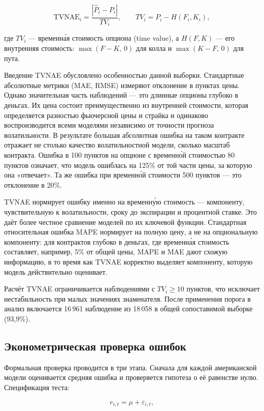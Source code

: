 \documentclass[11pt,a4paper]{article}
\begin{document}
\begin{equation}
\text{TVNAE}_i = \frac{|\hat{P}_i - P_i|}{TV_i},
\qquad
TV_i = P_i - H(F_i, K_i),
\end{equation}

где $TV_i$ --- временна́я стоимость опциона (time value), а $H(F, K)$ --- его внутренняя стоимость: $\max(F - K,\, 0)$ для колла и $\max(K - F,\, 0)$ для пута.

Введение TVNAE обусловлено особенностью данной выборки. Стандартные абсолютные метрики (MAE, RMSE) измеряют отклонение в пунктах цены. Однако значительная часть наблюдений --- это длинные опционы глубоко в деньгах. Их цена состоит преимущественно из внутренней стоимости, которая определяется разностью фьючерсной цены и страйка и одинаково воспроизводится всеми моделями независимо от точности прогноза волатильности. В результате большая абсолютная ошибка на таком контракте отражает не столько качество волатильностной модели, сколько масштаб контракта. Ошибка в 100 пунктов на опционе с временно́й стоимостью 80 пунктов означает, что модель ошиблась на 125\% от той части цены, за которую она «отвечает». Та же ошибка при временно́й стоимости 500 пунктов --- это отклонение в 20\%.

TVNAE нормирует ошибку именно на временну́ю стоимость --- компоненту, чувствительную к волатильности, сроку до экспирации и процентной ставке. Это даёт более честное сравнение моделей по их ключевой функции. Стандартная относительная ошибка MAPE нормирует на полную цену, а не на опциональную компоненту: для контрактов глубоко в деньгах, где временна́я стоимость составляет, например, 5\% от общей цены, MAPE и MAE дают схожую информацию, в то время как TVNAE корректно выделяет компоненту, которую модель действительно оценивает.

Расчёт TVNAE ограничивается наблюдениями с $TV_i \geq 10$ пунктов, что исключает нестабильность при малых значениях знаменателя. После применения порога в анализ включается 16\,961 наблюдение из 18\,058 в общей сопоставимой выборке (93{,}9\%).

\subsection{Эконометрическая проверка ошибок}

Формальная проверка проводится в три этапа. Сначала для каждой американской модели оценивается средняя ошибка и проверяется гипотеза о её равенстве нулю. Спецификация теста:

\begin{equation}
e_{i,t} = \mu + \varepsilon_{i,t},
\end{equation}
\end{document}
